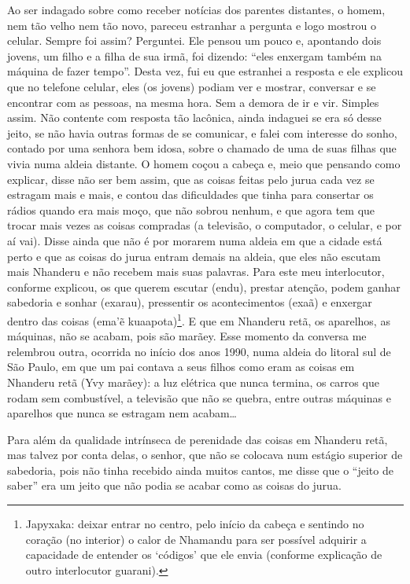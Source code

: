 {{Ao ser indagado sobre como receber notícias dos parentes distantes, o
homem, nem tão velho nem tão novo, pareceu estranhar a pergunta e logo
mostrou o celular. Sempre foi assim? Perguntei. Ele pensou um pouco e,
apontando dois jovens, um filho e a filha de sua irmã, foi dizendo:
``eles enxergam também na máquina de fazer tempo''. Desta vez, fui eu que
estranhei a resposta e ele explicou que no telefone celular, eles (os
jovens) podiam ver e mostrar, conversar e se encontrar com as pessoas,
na mesma hora. Sem a demora de ir e vir. Simples assim. Não contente
com resposta tão lacônica, ainda indaguei se era só desse jeito, se não
havia outras formas de se comunicar, e falei com interesse do sonho,
contado por uma senhora bem idosa, sobre o chamado de uma de suas
filhas que vivia numa aldeia distante. O homem coçou a cabeça e, meio
que pensando como explicar, disse não ser bem assim, que as coisas
feitas pelo jurua cada vez se estragam mais e mais, e contou das
dificuldades que tinha para consertar os rádios quando era mais moço,
que não sobrou nenhum, e que agora tem que trocar mais vezes as coisas
compradas (a televisão, o computador, o celular, e por aí vai). Disse
ainda que não é por morarem numa aldeia em que a cidade está perto e
que as coisas do jurua entram demais na aldeia, que eles não escutam
mais Nhanderu e não recebem mais suas palavras. Para este meu
interlocutor, conforme explicou, os que querem escutar (endu), prestar
atenção, podem ganhar sabedoria e sonhar (exarau), pressentir os
acontecimentos (exaã) e enxergar dentro das coisas (ema'ẽ
kuaapota)\footnote{Japyxaka: deixar entrar no centro, pelo início da
cabeça e sentindo no coração (no interior) o calor de Nhamandu para ser
possível adquirir a capacidade de entender os ‘códigos’ que ele envia
(conforme explicação de outro interlocutor guarani).}. E que em
Nhanderu retã, os aparelhos, as máquinas, não se acabam, pois são
marãey. Esse momento da conversa me relembrou outra, ocorrida no início
dos anos 1990, numa aldeia do litoral sul de São Paulo, em que um pai
contava a seus filhos como eram as coisas em Nhanderu retã (Yvy
marãey): a luz elétrica que nunca termina, os carros que rodam sem
combustível, a televisão que não se quebra, entre outras máquinas e
aparelhos que nunca se estragam nem acabam\ldots{} 

Para além da qualidade intrínseca de perenidade das coisas em Nhanderu
retã, mas talvez por conta delas, o senhor, que não se colocava num
estágio superior de sabedoria, pois não tinha recebido ainda muitos
cantos, me disse que o ``jeito de saber'' era um jeito que não podia se
acabar como as coisas do jurua.

}}
